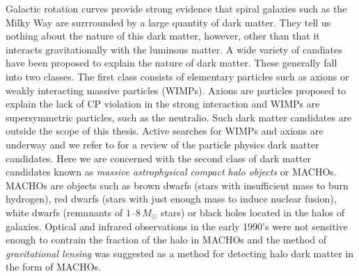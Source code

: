 Galactic rotation curves provide strong evidence that spiral galaxies such
as the Milky Way are surrrounded by a large quantity of dark matter. They
tell us nothing about the nature of this dark matter, however, other than that
it interacts gravitationally with the luminous matter. A wide variety of
candiates have been proposed to explain the nature of dark matter. These
generally fall into two classes. The first class consists of elementary
particles such as axions\cite{Weinberg:1977ma} or weakly interacting massive
particles (WIMPs)\cite{Goodman:1984dc}. Axions are particles proposed to
explain the lack of CP violation in the strong interaction and WIMPs are
supersymmetric particles, such as the neutralio. Such dark matter candidates
are outside the scope of this thesis. Active searches for WIMPs and axions are
underway and we refer to \cite{Griest:1995gs} for a review of the particle
physics dark matter candidates.  Here we are concerned with the second class
of dark matter candidates known as \emph{massive astrophysical compact halo
objects} or MACHOs.  MACHOs are objects such as brown dwarfs (stars with
insufficient mass to burn hydrogen), red dwarfs (stars with just enough mass
to induce nuclear fusion), white dwarfs (remnnants of $1$--$8\,M_\odot$ stars)
or black holes located in the halos of galaxies.  Optical and infrared
observations in the early 1990's were not sensitive enough to contrain the
fraction of the halo in MACHOs\cite{1994MNRAS.266..775K} and the method of
\emph{gravitational lensing} was suggested\cite{Paczynski:1985jf} as a method
for detecting halo dark matter in the form of MACHOs.

